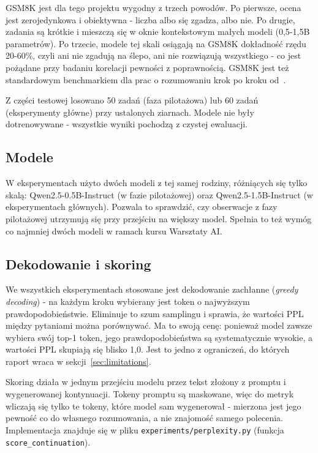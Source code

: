 GSM8K jest dla tego projektu wygodny z trzech powodów. Po pierwsze,
ocena jest zerojedynkowa i obiektywna - liczba albo się zgadza,
albo nie. Po drugie, zadania są krótkie i mieszczą się w oknie
kontekstowym małych modeli (0,5-1,5B parametrów). Po trzecie,
modele tej skali osiągają na GSM8K dokładność rzędu 20-60\%,
czyli ani nie zgadują na ślepo, ani nie rozwiązują wszystkiego -
co jest pożądane przy badaniu korelacji pewności z poprawnością.
GSM8K jest też standardowym benchmarkiem dla prac o rozumowaniu
krok po kroku od~\cite{wei2022cot}.

Z części testowej losowano 50 zadań (faza pilotażowa) lub 60 zadań
(eksperymenty główne) przy ustalonych ziarnach. Modele nie były
dotrenowywane - wszystkie wyniki pochodzą z czystej ewaluacji.

\subsection{Modele}
\label{sec:modele}

W eksperymentach użyto dwóch modeli z tej samej rodziny, różniących
się tylko skalą: Qwen2.5-0.5B-Instruct (w fazie pilotażowej) oraz
Qwen2.5-1.5B-Instruct (w eksperymentach głównych). Pozwala to
sprawdzić, czy obserwacje z fazy pilotażowej utrzymują się przy
przejściu na większy model. Spełnia to też wymóg co najmniej dwóch
modeli w ramach kursu Warsztaty AI.

\subsection{Dekodowanie i skoring}
\label{sec:dekodowanie}

We wszystkich eksperymentach stosowane jest dekodowanie zachłanne
(\emph{greedy decoding}) - na każdym kroku wybierany jest token
o najwyższym prawdopodobieństwie. Eliminuje to szum samplingu
i sprawia, że wartości PPL między pytaniami można porównywać.
Ma to swoją cenę: ponieważ model zawsze wybiera swój top-1 token,
jego prawdopodobieństwa są systematycznie wysokie, a wartości PPL
skupiają się blisko 1,0. Jest to jedno z ograniczeń, do których
raport wraca w sekcji~\ref{sec:limitations}.

Skoring działa w jednym przejściu modelu przez tekst złożony
z promptu i wygenerowanej kontynuacji. Tokeny promptu są maskowane,
więc do metryk wliczają się tylko te tokeny, które model sam
wygenerował - mierzona jest jego pewność co do własnego rozumowania,
a nie znajomość samego polecenia. Implementacja znajduje się w pliku
\texttt{experiments/perplexity.py} (funkcja \texttt{score\_continuation}).

